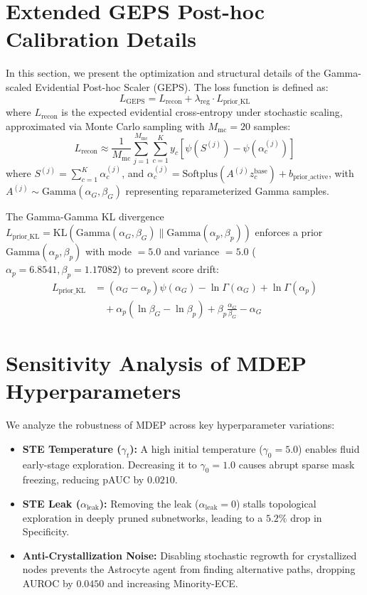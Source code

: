 \documentclass[letterpaper]{article} %
\begin{document}
\section{Extended GEPS Post-hoc Calibration Details}\label{sec:appendix_geps}
In this section, we present the optimization and structural details of the Gamma-scaled Evidential Post-hoc Scaler (GEPS). The loss function is defined as:
\begin{equation}
    L_{\text{GEPS}} = L_{\text{recon}} + \lambda_{\text{reg}} \cdot L_{\text{prior\_KL}}
\end{equation}
where $L_{\text{recon}}$ is the expected evidential cross-entropy under stochastic scaling, approximated via Monte Carlo sampling with $M_{\text{mc}} = 20$ samples:
\begin{equation}
    L_{\text{recon}} \approx \frac{1}{M_{\text{mc}}} \sum_{j=1}^{M_{\text{mc}}} \sum_{c=1}^K y_c \left[ \psi\left(S^{(j)}\right) - \psi\left(\alpha^{(j)}_c\right) \right]
\end{equation}
where $S^{(j)} = \sum_{c=1}^K \alpha^{(j)}_c$, and $\alpha^{(j)}_c = \text{Softplus}(A^{(j)} z^{\text{base}}_c) + b_{\text{prior\_active}}$, with $A^{(j)} \sim \text{Gamma}(\alpha_G, \beta_G)$ representing reparameterized Gamma samples. 

The Gamma-Gamma KL divergence $L_{\text{prior\_KL}} = \text{KL}(\text{Gamma}(\alpha_G, \beta_G) \parallel \text{Gamma}(\alpha_p, \beta_p))$ enforces a prior $\text{Gamma}(\alpha_p, \beta_p)$ with mode $= 5.0$ and variance $= 5.0$ ($\alpha_p = 6.8541, \beta_p = 1.17082$) to prevent score drift:
\begin{align}
    L_{\text{prior\_KL}} &= (\alpha_G - \alpha_p)\psi(\alpha_G) - \ln\Gamma(\alpha_G) + \ln\Gamma(\alpha_p) \nonumber \\
    &\quad + \alpha_p (\ln\beta_G - \ln\beta_p) + \beta_p \frac{\alpha_G}{\beta_G} - \alpha_G
\end{align}

\section{Sensitivity Analysis of MDEP Hyperparameters}
We analyze the robustness of MDEP across key hyperparameter variations:
\begin{itemize}
    \item \textbf{STE Temperature ($\gamma_t$):} A high initial temperature ($\gamma_0 = 5.0$) enables fluid early-stage exploration. Decreasing it to $\gamma_0 = 1.0$ causes abrupt sparse mask freezing, reducing pAUC by $0.0210$.
    \item \textbf{STE Leak ($\alpha_{\text{leak}}$):} Removing the leak ($\alpha_{\text{leak}} = 0$) stalls topological exploration in deeply pruned subnetworks, leading to a $5.2\%$ drop in Specificity.
    \item \textbf{Anti-Crystallization Noise:} Disabling stochastic regrowth for crystallized nodes prevents the Astrocyte agent from finding alternative paths, dropping AUROC by $0.0450$ and increasing Minority-ECE.
\end{itemize}
\end{document}
